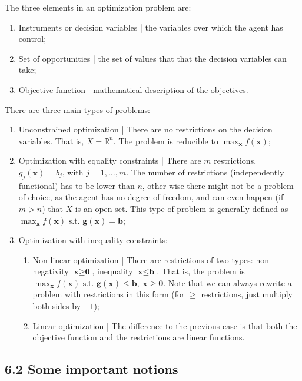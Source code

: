 \documentclass[0pt, a4paper]{article}
\begin{document}
The three elements in an optimization problem are:
\begin{enumerate}
	\item Instruments or decision variables | the variables over which the agent has control;
	\item Set of opportunities | the set of values that that the decision variables can take;
	\item Objective function | mathematical description of the objectives.
\end{enumerate}	

There are three main types of problems:
\begin{enumerate}
	\item Unconstrained optimization | There are no restrictions on the decision variables. That is, $X=\mathbb{R}^n$. The problem is reducible to $\max_\textbf{x} f(\textbf{x})$;
	\item Optimization with equality constraints | There are $m$ restrictions, $g_j(\textbf{x})=b_j$, with $j=1,\dots,m$. The number of restrictions (independently functional) has to be lower than $n$, other wise there might not be a problem of choice, as the agent has no degree of freedom, and can even happen (if $m>n$) that $X$ is an open set. This type of problem is generally defined as $\max_\textbf{x}f(\textbf{x})\text{ s.t. }\textbf{g}(\textbf{x})=\textbf{b}$;
	\item Optimization with inequality constraints:
	    \begin{enumerate}
			\item Non-linear optimization | There are restrictions of two types: non-negativity $\textbf{x}\geq\textbf{0}$, inequality $\textbf{x}\leq\textbf{b}$. That is, the problem is $\max_\textbf{x} f(\textbf{x})\text{ s.t. }\textbf{g}(\textbf{x})\leq\textbf{b},\ \textbf{x}\geq\textbf{0}$. Note that we can always rewrite a problem with restrictions in this form (for $\geq$ restrictions, just multiply both sides by $-1$);
			\item  Linear optimization | The difference to the previous case is that both the objective function and the restrictions are linear functions.
		\end{enumerate}
\end{enumerate}	

\subsection*{6.2 Some important notions}
\end{document}

